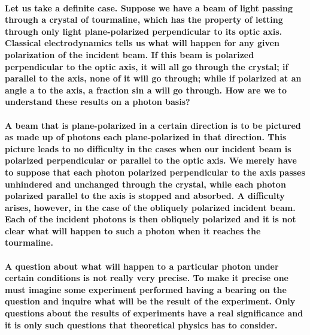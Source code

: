 \documentclass[10pt, kindle, oneside]{kindle}
\begin{document}
\paragraph{Let us take a definite case. Suppose we have a beam of light passing through a crystal of tourmaline, which has the property of letting through only light plane-polarized perpendicular to its optic axis. Classical electrodynamics tells us what will happen for any given polarization of the incident beam. If this beam is polarized perpendicular to the optic axis, it will all go through the crystal; if parallel to the axis, none of it will go through; while if polarized at an angle a to the axis, a fraction sin a will go through. How are we to understand these results on a photon basis?}
\paragraph{A beam that is plane-polarized in a certain direction is to be pictured as made up of photons each plane-polarized in that direction. This picture leads to no difficulty in the cases when our incident beam is polarized perpendicular or parallel to the optic axis. We merely have to suppose that each photon polarized perpendicular to the axis passes unhindered and unchanged through the crystal, while each photon polarized parallel to the axis is stopped and absorbed. A difficulty arises, however, in the case of the obliquely polarized incident beam. Each of the incident photons is then obliquely polarized and it is not clear what will happen to such a photon when it reaches the tourmaline.}
\paragraph{A question about what will happen to a particular photon under certain conditions is not really very precise. To make it precise one must imagine some experiment performed having a bearing on the question and inquire what will be the result of the experiment. Only questions about the results of experiments have a real significance and it is only such questions that theoretical physics has to consider.}
\end{document}
